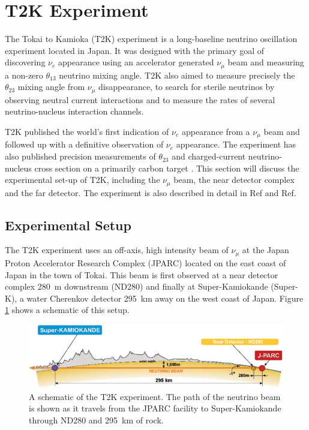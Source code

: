\section{T2K Experiment}
\label{sec:detectordescription}

The Tokai to Kamioka (T2K) experiment is a long-baseline neutrino oscillation experiment located in Japan. It was designed with the primary goal of discovering $\nu_e$ appearance using an accelerator generated $\nu_\mu$ beam and measuring a non-zero $\theta_{13}$ neutrino mixing angle. T2K also aimed to measure precisely the $\theta_{23}$ mixing angle from $\nu_{\mu}$ disappearance, to search for sterile neutrinos by observing neutral current interactions and to measure the rates of several neutrino-nucleus interaction channels.

T2K published the world's first indication of $\nu_e$ appearance from a $\nu_\mu$ beam\cite{nueApp1} and followed up with a definitive observation of $\nu_e$ appearance\cite{nueApp3}. The experiment has also published precision measurements of $\theta_{23}$ \cite{muDis} and charged-current neutrino-nucleus cross section on a primarily carbon target \cite{ccinc}. This section will discuss the experimental set-up of T2K, including the $\nu_\mu$ beam, the near detector complex and the far detector. The experiment is also described in detail in Ref\cite{t2kex} and Ref\cite{p0dnim}.

\subsection{Experimental Setup}

The T2K experiment uses an off-axis, high intensity beam of $\nu_\mu$ at the Japan Proton Accelerator Research Complex (JPARC) located on the east coast of Japan in the town of Tokai. This beam is first observed at a near detector complex 280~m downstream (ND280) and finally at Super-Kamiokande (Super-K), a water Cherenkov detector 295~km away on the west coast of Japan. Figure \ref{fig:t2k_overview} shows a schematic of this setup.

\begin{figure}[h]
\includegraphics[width=.9\textwidth]{./Figures/t2k-schematic.jpg}
\caption{A schematic of the T2K experiment. The path of the neutrino beam is shown as it travels from the JPARC facility to Super-Kamiokande through ND280 and 295~km of rock. \label{fig:t2k_overview}}
\end{figure}

